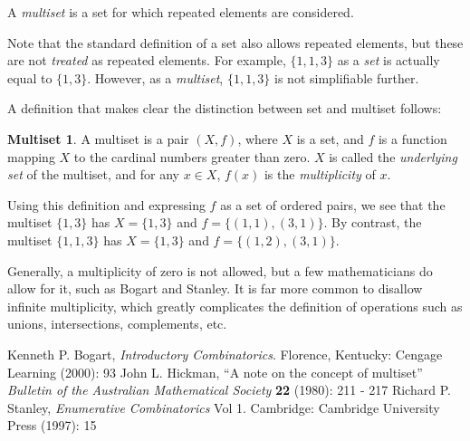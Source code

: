 \documentclass[12pt]{article}
\theoremstyle{definition}
\newtheorem*{defn}{Multiset}
\begin{document}
A \emph{multiset} is a set for which repeated elements are considered.

Note that the standard definition of a set also allows repeated elements, but these are not \emph{treated} as repeated elements.  For example, $\{1,1,3\}$ as a \emph{set} is actually equal to $\{1,3\}$. However, as a \emph{multiset}, $\{1,1,3\}$ is not simplifiable further.

A definition that makes clear the distinction between set and multiset follows:

\begin{defn}
A multiset is a pair $(X, f)$, where $X$ is a set, and $f$ is a function mapping $X$ to the cardinal numbers greater than zero.  $X$ is called the \emph{underlying set} of the multiset, and for any $x \in X$, $f(x)$ is the \emph{multiplicity} of $x$.
\end{defn}

Using this definition and expressing $f$ as a set of ordered pairs, we see that the multiset $\{1,3\}$ has $X = \{1,3\}$ and $f = \{(1,1),(3,1)\}$.  By contrast, the multiset $\{1,1,3\}$  has $X = \{1,3\}$  and $f = \{(1,2),(3,1)\}$.

Generally, a multiplicity of zero is not allowed, but a few mathematicians do allow for it, such as Bogart and Stanley. It is far more common to disallow infinite multiplicity, which greatly complicates the definition of operations such as unions, intersections, complements, etc.

\begin{thebibliography}{3}
 Kenneth P. Bogart, {\it Introductory Combinatorics}. Florence, Kentucky: Cengage Learning (2000): 93
 John L. Hickman, ``A note on the concept of multiset'' {\it Bulletin of the Australian Mathematical Society}  {\bf 22} (1980): 211 - 217
 Richard P. Stanley, {\it Enumerative Combinatorics} Vol 1. Cambridge: Cambridge University Press (1997): 15
\end{thebibliography}
\end{document}
